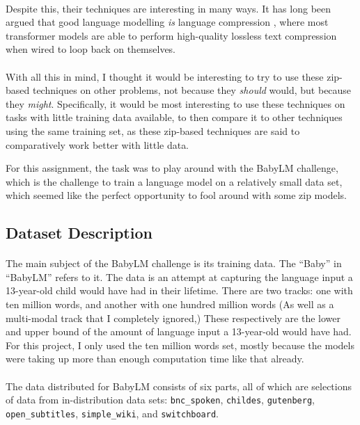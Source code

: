 \documentclass[11pt]{article}
\begin{document}
\paragraph{}
Despite this, their techniques are interesting in many ways. It has long been argued that good language modelling \textit{is} language compression \parencite{deletang2023language}, where most transformer models are able to perform high-quality lossless text compression when wired to loop back on themselves.

\paragraph{}
With all this in mind, I thought it would be interesting to try to use these zip-based techniques on other problems, not because they \textit{should} would, but because they \textit{might}. Specifically, it would be most interesting to use these techniques on tasks with little training data available, to then compare it to other techniques using the same training set, as these zip-based techniques are said to comparatively work better with little data.

For this assignment, the task was to play around with the BabyLM challenge, which is the challenge to train a language model on a relatively small data set, which seemed like the perfect opportunity to fool around with some zip models.


\subsection{Dataset Description}
\paragraph{}
The main subject of the BabyLM challenge is its training data. The ``Baby'' in ``BabyLM'' refers to it. The data is an attempt at capturing the language input a 13-year-old child would have had in their lifetime. There are two tracks: one with ten million words, and another with one hundred million words (As well as a multi-modal track that I completely ignored,) These respectively are the lower and upper bound of the amount of language input a 13-year-old would have had. For this project, I only used the ten million words set, mostly because the models were taking up more than enough computation time like that already.

\paragraph{}
The data distributed for BabyLM consists of six parts, all of which are selections of data from in-distribution data sets: \verb|bnc_spoken|, \verb|childes|, \verb|gutenberg|, \verb|open_subtitles|, \verb|simple_wiki|, and \verb|switchboard|.
\end{document}
